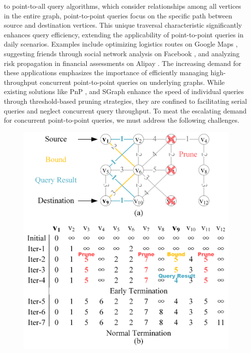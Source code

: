 \documentclass[10pt,journal,compsoc]{IEEEtran}
\begin{document}
 to point-to-all query algorithms, which consider relationships among all vertices in the entire graph, point-to-point queries focus on the specific path between source and destination vertices. This unique traversal characteristic significantly enhances query efficiency, extending the applicability of point-to-point queries in daily scenarios. Examples include optimizing logistics routes on Google Maps \cite{google}, suggesting friends through social network analysis on Facebook \cite{facebook}, and analyzing risk propagation in financial assessments on Alipay \cite{alipay}. The increasing demand for these applications emphasizes the importance of efficiently managing high-throughput concurrent point-to-point queries on underlying graphs. While existing solutions like PnP \cite{pnp},  and SGraph \cite{sgraph} enhance the speed of individual queries through threshold-based pruning strategies, they are confined to facilitating serial queries and neglect concurrent query throughput. To meat the escalating demand for concurrent point-to-point queries, we must address the following challenges.
\begin{figure}[t]
    \centering
    \includegraphics[width=\columnwidth]{picture/Zhang-fig1.png}
    \captionsetup{labelsep=period}
    \caption{}
    \label{fig1}
    \vspace{-0.5cm}
\end{figure}
\end{document}
